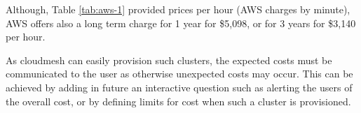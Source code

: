 \begin{table}[h]
\caption{MLPerf Benchmarking Results from MLCommons using NVIDIA A100-SXM4-80GB (400W) GPU model \citep{mlcommonsBenchmarkMLPerf}}
\smallskip
\label{tab:aws-2}

\bigskip
\end{table}



Although, Table \ref{tab:aws-1} provided prices per hour (AWS charges by minute), AWS offers also a long term charge for 1 year for \$5,098, or for 3 years for   
 \$3,140 per hour. 
 
As cloudmesh can easily provision such clusters, the expected costs must be communicated to the user as otherwise unexpected costs may occur. This can be achieved by adding in future an interactive question such as alerting the users of the overall cost, or by defining limits for cost when such a cluster is provisioned.

